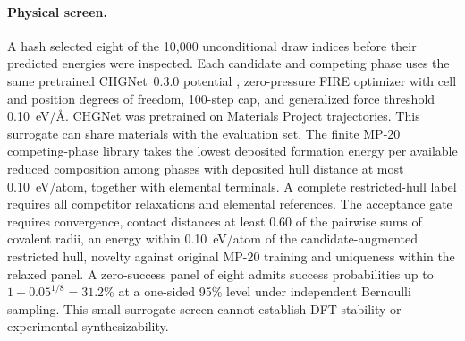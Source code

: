 \paragraph{Physical screen.} A hash selected eight of the 10,000 unconditional draw indices before their predicted energies were inspected. Each candidate and competing phase uses the same pretrained CHGNet~0.3.0 potential \cite{chgnet}, zero-pressure FIRE optimizer with cell and position degrees of freedom, 100-step cap, and generalized force threshold 0.10~eV/\AA. CHGNet was pretrained on Materials Project trajectories. This surrogate can share materials with the evaluation set. The finite MP-20 competing-phase library takes the lowest deposited formation energy per available reduced composition among phases with deposited hull distance at most 0.10~eV/atom, together with elemental terminals. A complete restricted-hull label requires all competitor relaxations and elemental references. The acceptance gate requires convergence, contact distances at least 0.60 of the pairwise sums of covalent radii, an energy within 0.10~eV/atom of the candidate-augmented restricted hull, novelty against original MP-20 training and uniqueness within the relaxed panel. A zero-success panel of eight admits success probabilities up to $1-0.05^{1/8}=31.2\%$ at a one-sided 95\% level under independent Bernoulli sampling. This small surrogate screen cannot establish DFT stability or experimental synthesizability.
